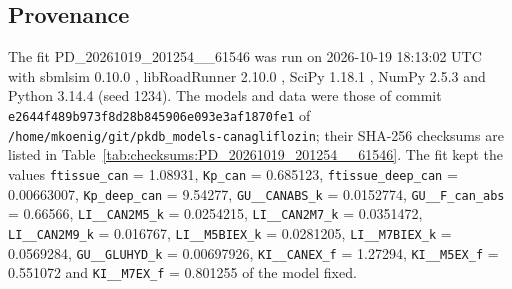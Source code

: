 \subsection{Provenance}

The fit PD\_20261019\_201254\_\_61546 was run on 2026-10-19 18:13:02 UTC with sbmlsim 0.10.0 \cite{Koenig2026_sbmlsim}, libRoadRunner 2.10.0 \cite{Welsh2023}, SciPy 1.18.1 \cite{Virtanen2020}, NumPy 2.5.3 \cite{Harris2020} and Python 3.14.4 (seed 1234). The models and data were those of commit \texttt{e2644f489b973f8d28b845906e093e3af1870fe1} of \texttt{/home/mkoenig/git/pkdb\_models-canagliflozin}; their SHA-256 checksums are listed in Table~\ref{tab:checksums:PD_20261019_201254__61546}. The fit kept the values \texttt{ftissue\_can} = 1.08931, \texttt{Kp\_can} = 0.685123, \texttt{ftissue\_deep\_can} = 0.00663007, \texttt{Kp\_deep\_can} = 9.54277, \texttt{GU\_\_CANABS\_k} = 0.0152774, \texttt{GU\_\_F\_can\_abs} = 0.66566, \texttt{LI\_\_CAN2M5\_k} = 0.0254215, \texttt{LI\_\_CAN2M7\_k} = 0.0351472, \texttt{LI\_\_CAN2M9\_k} = 0.016767, \texttt{LI\_\_M5BIEX\_k} = 0.0281205, \texttt{LI\_\_M7BIEX\_k} = 0.0569284, \texttt{GU\_\_GLUHYD\_k} = 0.00697926, \texttt{KI\_\_CANEX\_f} = 1.27294, \texttt{KI\_\_M5EX\_f} = 0.551072 and \texttt{KI\_\_M7EX\_f} = 0.801255 of the model fixed.

